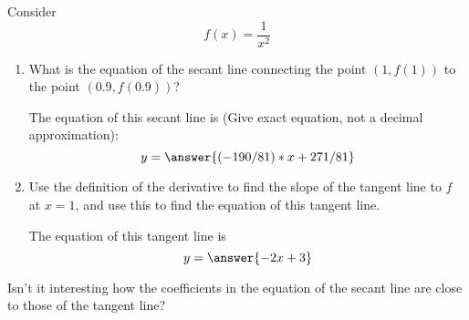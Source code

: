 \documentclass{ximera}
\author{Steven Gubkin \and Bobby Ramsey}
\begin{document}
\begin{exercise}

Consider
\[
f(x) = \frac{1}{x^2}
\]



\begin{enumerate}
\item What is the equation of the secant line connecting the point $(1,f(1))$ to the point $(0.9,f(0.9))$?
\begin{prompt}
The equation of this secant line is (Give exact equation, not a decimal approximation):
\[ y = \answer{ (-190/81)*x + 271/81 }\]
\end{prompt}

\item  Use the definition of the derivative to find the slope of the tangent line to $f$ at $x=1$, and use this to find the equation of this tangent line.

\begin{prompt}
The equation of this tangent line is
\[y = \answer{ -2x + 3}\]
\end{prompt}

\end{enumerate}

Isn't it interesting how the coefficients in the equation of the secant line are close to those of the tangent line?
\end{exercise}
\end{document}
